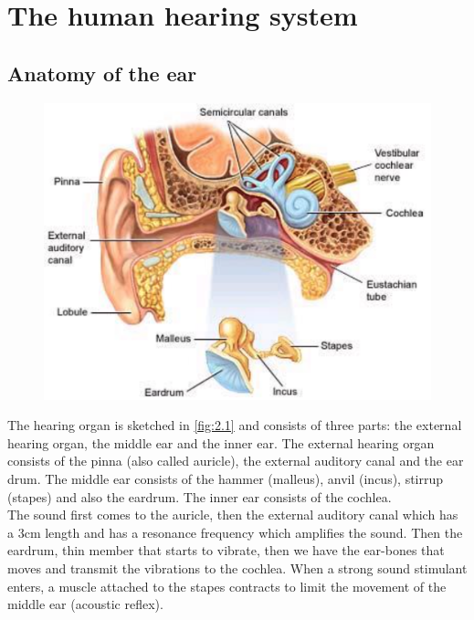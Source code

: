 
\chapter{The human hearing system}
\section{Anatomy of the ear}
	\begin{figure}
	\vspace{-5mm}
	\includegraphics[scale=0.25]{acoustics/ch2/1}
	\label{fig:2.1}
	\end{figure}
	The hearing organ is sketched in \autoref{fig:2.1} and consists of three parts: the external hearing organ, the middle ear and the inner ear. The external hearing organ consists of the pinna (also called auricle), the external auditory canal and the ear drum. The middle ear consists of the hammer (malleus), anvil (incus), stirrup (stapes) and also the eardrum. The inner ear consists of the cochlea. \\
	
	The sound first comes to the auricle, then the external auditory canal which  has a 3cm length and has a resonance frequency which amplifies the sound. Then the eardrum, thin member that starts to vibrate, then we have the ear-bones that moves and transmit the vibrations to the cochlea. When a strong sound stimulant enters, a muscle attached to the stapes contracts to limit the movement of the middle ear (acoustic reflex). 
	
